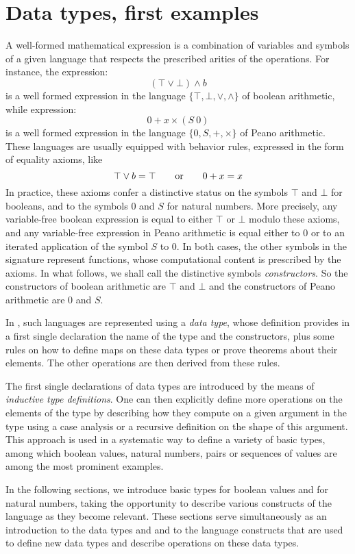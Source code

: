 \section{Data types, first examples}
\label{sec:data}
A well-formed mathematical expression is a combination of variables
and symbols of a given language
that respects the prescribed arities of
the operations. For instance, the expression:
\[(\top \vee \bot) \wedge b\]
is a well formed expression in the language $\{\top, \bot,\vee,\wedge\}$ of
boolean arithmetic, while expression:
\[ 0 + x \times (S\ 0) \]
is a well formed expression in the language $\{0,S, +, \times\}$ of
Peano arithmetic.  These languages are usually equipped with
behavior rules, expressed in the form of equality axioms, like
\[\top \vee b = \top \qquad \hbox{or} \qquad 0 + x = x\]
In
practice, these axioms confer a distinctive status on
the symbols $\top$ and $\bot$ for booleans, and to the symbols $0$ and
$S$ for natural numbers. More precisely, any variable-free boolean expression
is equal to either $\top$ or $\bot$ modulo these axioms, and any
variable-free expression in Peano arithmetic is equal either to $0$ or
to an iterated application of the symbol $S$ to $0$.  In both
cases, the other symbols in the signature represent functions, whose
computational content is prescribed by the axioms.  In what follows,
we shall call the distinctive symbols \emph{constructors}.  So the constructors
of boolean arithmetic are \(\top\) and \(\bot\) and the constructors of
Peano arithmetic are \(0\) and \(S\).

In \Coq{}, such languages are represented using a \emph{data type},
whose definition provides in a first single declaration the name of the
type and the constructors, plus some rules on how to define maps on
these data types or prove theorems about their elements.  The other
operations are then derived from these rules.

The first single declarations of data types are introduced by the means of
\emph{inductive type definitions}.
One can then explicitly define more operations on the elements of
the type by describing how they compute on a given argument in the
type using a case analysis or a recursive definition on the
shape of this argument.
This approach is used in a systematic way to define a variety of basic
types, among which boolean values, natural numbers, pairs or
sequences of values are among the most prominent examples.

In the following sections, we introduce basic types  for boolean
values and  for natural numbers, taking the opportunity to describe
various constructs of the \Coq{} language as they become relevant.  These
sections serve simultaneously as an introduction to the data types
 and  and to the \Coq{} language constructs that
are used to define new data types and describe operations on these
data types.
